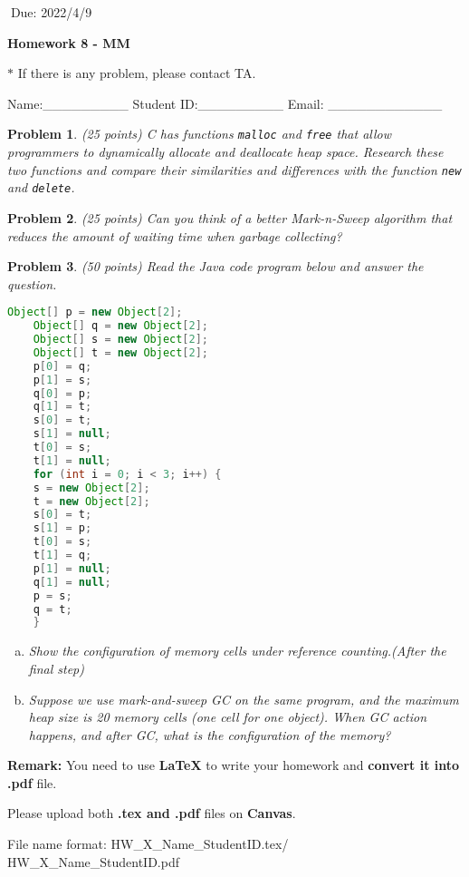 \documentclass[12pt]{article}
\newtheorem{hw}{Problem}
\begin{document}
$\;$\hfill Due: 2022/4/9

\begin{center}
{\LARGE\bf Homework 8 - MM}
\end{center}

\begin{center}
	\footnotesize{\color{red}$*$ If there is any problem, please contact TA.}
	
	\footnotesize{\color{blue} \quad Name:\_\_\_\_\_\_\_\_\_  \quad Student ID:\_\_\_\_\_\_\_\_\_ \quad Email: \_\_\_\_\_\_\_\_\_\_\_\_}
\end{center}

\begin{hw}\rm (25 points)
	C has functions \texttt{malloc} and \texttt{free} that allow programmers to dynamically allocate and deallocate heap space. Research these two functions and compare their similarities and differences with the function \texttt{new} and \texttt{delete}.
\end{hw}

\begin{hw}\rm (25 points)
	Can you think of a better Mark-n-Sweep algorithm that reduces the amount of waiting time when garbage collecting?
\end{hw}

\begin{hw}\rm (50 points)
	Read the Java code program below and answer the question.
	
	\centering
	\begin{lstlisting}[language=Java] 
	Object[] p = new Object[2];
	Object[] q = new Object[2];
	Object[] s = new Object[2];
	Object[] t = new Object[2];
	p[0] = q;
	p[1] = s;
	q[0] = p;
	q[1] = t;
	s[0] = t;
	s[1] = null;
	t[0] = s;
	t[1] = null;
	for (int i = 0; i < 3; i++) {
	s = new Object[2];
	t = new Object[2];
	s[0] = t;
	s[1] = p;
	t[0] = s;
	t[1] = q;
	p[1] = null;
	q[1] = null;
	p = s;
	q = t;
	}
	\end{lstlisting} 
	
	\begin{enumerate}[(a)]
		\item Show the configuration of memory cells under reference counting.(After the final step)
		\item Suppose we use mark-and-sweep GC on the same program, and the maximum heap
		size is 20 memory cells (one cell for one object). When GC action happens, and after GC, what is the
		configuration of the memory?
	\end{enumerate}
\end{hw}



\vspace{20pt}

\textbf{Remark:} 
You need to use \textbf{LaTeX} to write your homework and \textbf{convert it into .pdf} file.

Please upload both \textbf{.tex and .pdf} files on \textbf{Canvas}.

File name format: {\color{red} HW\_X\_Name\_StudentID.tex/\color{red} HW\_X\_Name\_StudentID.pdf}
\end{document}
